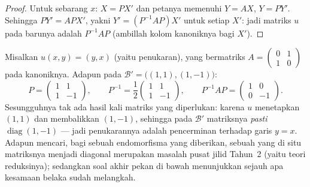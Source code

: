 \begin{proof}
Untuk sebarang $x$: $X = PX'$ dan petanya memenuhi $Y = AX$, $Y = PY'$.
Sehingga $PY' = APX'$, yakni $Y' = (P^{-1}AP)X'$ untuk setiap $X'$: jadi matriks
$u$ pada  barunya adalah $P^{-1}AP$ (ambillah kolom kanoniknya
bagi $X'$).
\end{proof}

\begin{example}
\label{ex:b1:matrices:conjugationrun}
Misalkan $u(x, y) = (y, x)$ (yaitu penukaran), yang bermatriks $A = \begin{pmatrix} 0
& 1\\ 1 & 0\end{pmatrix}$ pada  kanoniknya. Adapun pada 
$\mathcal B' = \bigl((1,1), (1,-1)\bigr)$:
\[
P = \begin{pmatrix} 1 & 1\\ 1 & -1 \end{pmatrix},
\qquad
P^{-1} = \frac12\begin{pmatrix} 1 & 1\\ 1 & -1 \end{pmatrix},
\qquad
P^{-1} A P = \begin{pmatrix} 1 & 0\\ 0 & -1 \end{pmatrix}.
\]
Sesungguhnya tak ada hasil kali matriks yang diperlukan: karena $u$ menetapkan $(1,1)$ dan
membalikkan $(1,-1)$, sehingga pada $\mathcal B'$ matriksnya \emph{pasti}
$\operatorname{diag}(1, -1)$ --- jadi penukarannya adalah pencerminan
terhadap garis $y = x$. Adapun mencari, bagi sebuah endomorfisma yang diberikan, sebuah
 yang di situ matriksnya menjadi diagonal merupakan masalah pusat
jilid Tahun~2 (yaitu teori reduksinya); sedangkan soal akhir pekan
di bawah menunjukkan sejauh apa kesamaan  belaka sudah melangkah.
\end{example}

